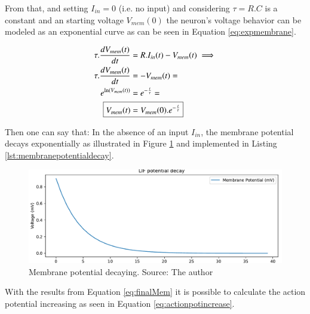 			\par From that, and setting $I_{in} = 0$ (i.e. no input) and considering $\tau = R.C$ is a constant and an starting voltage $V_{mem}(0)$ the neuron's voltage behavior can be modeled as an exponential curve as can be seen in Equation \ref{eq:expmembrane}.
		
		 	\begin{equation}
		 		\label{eq:expmembrane}
		 		\begin{aligned}
		 		\tau.\dfrac{dV_{mem}(t)}{dt} &= R.I_{in}(t) - V_{mem}(t) \implies \\
		 		\tau.\dfrac{dV_{mem}(t)}{dt} &= -V_{mem}(t) = \\
		 		e^{\ln(V_{mem}(t))} &= e^{-\frac{t}{\tau}} = \\
		 		\Aboxed{V_{mem}(t) &= V_{mem}(0).e^{-\frac{t}{\tau}}}
		 		\end{aligned}
		 	\end{equation}
	 	
	 		\par Then one can say that: In the absence of an input $I_{in}$, the membrane potential decays exponentially as illustrated in Figure \ref{fig:membranepotentialdecay} and implemented in Listing \ref{lst:membranepotentialdecay}.
	 		
	 		
	 		
	 		\begin{figure}[H]
	 			\centering
	 			\includegraphics[width=0.7\linewidth]{images/membranePotentialDecay}
	 			\caption{Membrane potential decaying. Source: The author}
	 			\label{fig:membranepotentialdecay}
	 		\end{figure}
 			
 			\par With the results from Equation \ref{eq:finalMem} it is possible to calculate the action potential increasing as seen in Equation \ref{eq:actionpotincrease}.
 			
